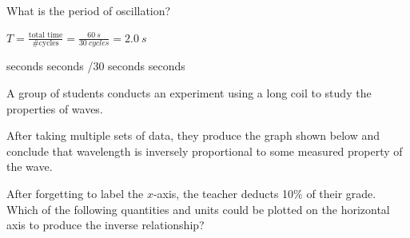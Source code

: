 \documentclass[answers]{exam}
\begin{document}
\begin{questions}
What is the period of oscillation?

\ifprintanswers
{\color{red}

$T = \frac{\text{total time}}{\text{\# cycles}} = \frac{\SI{60}{s}}{\SI{30}{cycles}} = \boxed{\SI{2.0}{s}}$

\medskip
}
\fi

\begin{randomizechoices}
     seconds
     seconds
    /30 seconds
     seconds
\end{randomizechoices}

\question
A group of students conducts an experiment using a long coil to study the properties of waves.

\begin{center}
\end{center}

After taking multiple sets of data, they produce the graph shown below and conclude that wavelength is inversely proportional to some measured property of the wave.

\begin{center}
\end{center}

After forgetting to label the $x$-axis, the teacher deducts 10\% of their grade. Which of the following quantities and units could be plotted on the horizontal axis to produce the inverse relationship?


\end{questions}
\end{document}
